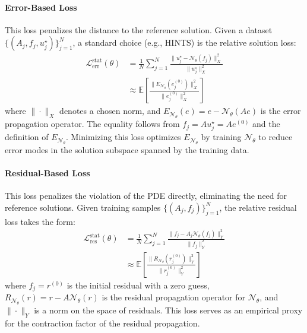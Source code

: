 \documentclass[11pt]{article}
\begin{document}
\paragraph{Error-Based Loss} This loss penalizes the distance to the reference solution. Given a dataset $\{(A_j,f_j,u_j^\star)\}_{j=1}^N$, a standard choice (e.g., HINTS) is the relative solution loss:
\begin{equation}
    \begin{aligned}
        \mathcal L_{\mathrm{err}}^\mathrm{stat}(\theta) & = \frac1N \sum_{j=1}^N \frac{\bigl\|u_j^\star - \mathcal N_\theta(f_j)\bigr\|_X^2} {\|u_j^\star\|_X^2}
        \\& \approx \mathbb E \left[ \frac{\bigl\|E_{\mathcal N_\theta} \left(e_j^{(0)}\right)\|_X^2} {\|e_j^{(0)}\|_X^2}\right]
    \end{aligned}
\end{equation}
where $\|\cdot\|_X$ denotes a chosen norm, and $E_{\mathcal N_\theta}(e)=e-\mathcal N_\theta(Ae)$ is the error propagation operator. The equality follows from $f_j= Au_j^\star=Ae^{(0)}$ and the definition of $E_{\mathcal N_\theta}$. Minimizing this loss optimizes $E_{\mathcal N_\theta}$ by training $\mathcal N_\theta$ to reduce error modes in the solution subspace spanned by the training data.

\paragraph{Residual-Based Loss} This loss penalizes the violation of the PDE directly, eliminating the need for reference solutions. Given training samples $\{(A_j,f_j)\}_{j=1}^N$, the relative residual loss takes the form:
\begin{equation}
    \begin{aligned}
        \mathcal L_{\mathrm{res}}^\mathrm{stat}(\theta) & = \frac1N \sum_{j=1}^N \frac{\bigl\|f_j - A_j \mathcal N_\theta(f_j)\bigr\|_Y^2}{\|f_j\|_Y^2}
        \\& \approx \mathbb{E} \left[\frac{\bigl\|R_{\mathcal N_\theta}\left(r_j^{(0)}\right)\bigr\|_Y^2}{\|r_j^{(0)}\bigr\|_Y^2}\right]
    \end{aligned}
\end{equation}
where $f_j=r^{(0)}$ is the initial residual with a zero guess, $R_{\mathcal N_\theta}(r) = r - A\mathcal N_\theta(r)$ is the residual propagation operator for $\mathcal N_\theta$, and $\|\cdot\|_Y$ is a norm on the space of residuals. This loss serves as an empirical proxy for the contraction factor of the residual propagation.
\end{document}
